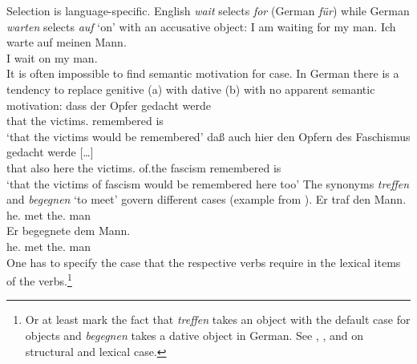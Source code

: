 \begin{exe}
\begin{xlist}[iv.]
\begin{exe}
\begin{xlist}[iv.]
Selection is language-specific.  English \emph{wait} selects \emph{for} (German \emph{für}) while German \emph{warten} selects \emph{auf} `on' with an accusative object:
\eal \label{loureed}
\ex I am waiting for my man.
\ex 
\gll Ich warte auf meinen Mann.\\
     I   wait  on  my     man.\acc\\
\zl
It is often impossible to find semantic motivation for case.  In German there is a
tendency to replace genitive (a) with dative (b) with no apparent semantic motivation:  
\eal
\ex 
\gll dass der Opfer gedacht werde\\
     that the victims.\gen{} remembered is\\
\glt `that the victims would be remembered'
\ex 
\gll daß auch hier den Opfern des Faschismus gedacht werde [\ldots]\footnotemark\\
     that also here the victims.\dat{} of.the fascism remembered is\\
\glt `that the victims of fascism would be remembered here too'
\zl
The synonyms \emph{treffen} and \emph{begegnen} `to meet' govern different cases (example from \citet[]{ps}).
\eal
\ex 
\gll Er traf den Mann.\\
     he.\nom{} met the.\acc{} man\\
\ex 
\gll Er begegnete dem Mann.\\
     he.\nom{} met the.\dat{} man\\
\zl
One has to specify the case that the respective verbs require in the lexical items of the verbs.\footnote{
  Or at least mark the fact that \emph{treffen} takes an object with the default case for
  objects and \emph{begegnen} takes a dative object in German. See , , and
   on structural and lexical case.
}
%


\end{xlist}
\end{exe}
\end{xlist}
\end{exe}
